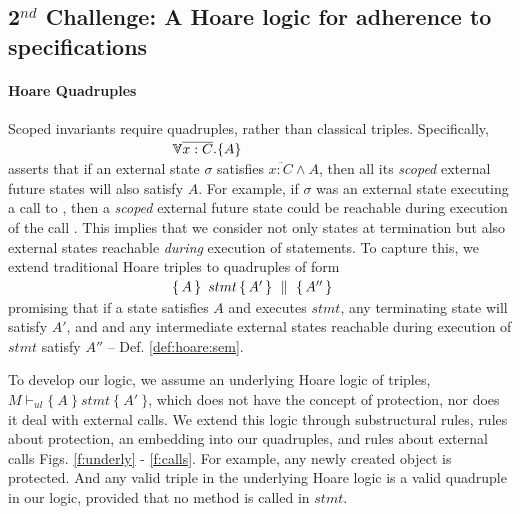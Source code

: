   
  \subsection{2$^{nd}$ Challenge:  A Hoare logic for adherence to specifications}  
 \label{sec:howSecond}

\paragraph{Hoare Quadruples} Scoped invariants require quadruples, rather than  classical triples.
Specifically, \\
  $\strut \ \hspace{4cm} {\TwoStatesN  {\overline{x:C}}  {A}}$\\
 asserts that if an external {state} $\sigma$ 
 satisfies  $\overline {x:C} \wedge A$, then all its \emph{scoped} external future  states will   also  satisfy  $A$. 
For example, if $\sigma$ was an external state executing a call to , then a \emph{scoped} external future  state
 could be reachable during execution of the   call .
This implies that we consider not only states at termination but also external states reachable
 \emph{during} execution of  statements. 
To  capture this, we extend   traditional Hoare triples to quadruples of  form\\
 $\strut \ \hspace{4cm} \quadruple {A} {\, stmt\, }{A'} {A''}$\\  
 promising that if a state satisfies $A$ and executes $stmt$, any terminating state will satisfy $A'$, and 
 and  any intermediate external states reachable during execution of $stmt$ satisfy    $A''$ -- \cf Def. \ref{def:hoare:sem}.
 
\vspace{.1cm}

To develop our logic, we   assume  an  underlying   Hoare logic  of  triples, 
$ M \vdash_{ul} \{ \ A\ \} {\ stmt\ }\{\ A'\ \} $,
which does not {have} the concept of protection, nor does it deal with external calls.
We extend this logic through  
substructural rules,   rules about protection,  an embedding into our quadruples, and rules about external calls
\cf Figs. \ref{f:underly} -  \ref{f:calls}.
%
For example, any newly created object is protected. And any %
valid triple in the underlying Hoare logic is a valid quadruple in our logic, provided that no method is called in $stmt$.


